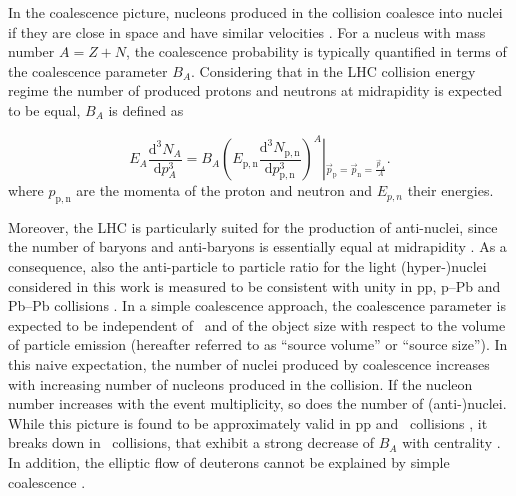 In the coalescence picture, nucleons produced in the collision coalesce into nuclei if they are close in space and have similar velocities \cite{Butler:1963,Kapusta:1980}. 
For a nucleus with mass number $A = Z + N$, the coalescence probability is typically quantified in terms of the coalescence parameter $B_{A}$.
Considering that in the LHC collision energy regime the number of produced protons and neutrons at midrapidity is expected to be equal,  $B_{A}$ is defined as

\begin{equation}
E_{A}\frac{\mathrm{d}^{3}N_{A}}{\mathrm{d}p_{A}^{3}}=B_{A}{\left(E_{\mathrm{p,n}}\frac{\mathrm{d}^{3}N_{\mathrm{p,n}}}{\mathrm{d}p_{\mathrm{p,n}}^{3}}\right)^{A}}\left\vert_{\vec{p}_{\mathrm{p}}=\vec{p}_{\mathrm{n}}=\frac{\vec{p}_{A}}{A}} \right..
\label{eq:BA}
\end{equation}
%
where $p_{\mathrm{p,n}}$ are the momenta of the proton and neutron and $E_{p,n}$ their energies.

Moreover, the LHC is particularly suited for the production of anti-nuclei, since the number of baryons and anti-baryons is essentially equal at midrapidity \cite{Abbas:2013rua}. As a consequence, also the anti-particle to particle ratio for the light (hyper-)nuclei considered in this work is measured to be consistent with unity in pp, p--Pb and Pb--Pb collisions \cite{ALICE:nucleipp2017, anielski-HQ14, Acharya:2017dmc, Adam:2015yta}.
In a simple coalescence approach, the coalescence parameter is expected to be independent of \pt~and of the object size with respect to the volume of particle emission (hereafter referred to as ``source volume'' or ``source size'').
In this naive expectation, the number of nuclei produced by coalescence increases with increasing number of nucleons produced in the collision. If the nucleon number increases with the event multiplicity, so does the number of (anti-)nuclei. 
While this picture is found to be approximately valid in pp and \pPb~collisions \cite{ALICE:nucleipp2017, anielski-HQ14}, it breaks down in \PbPb~collisions, that exhibit a strong decrease of $B_{A}$ with centrality \cite{ALICE:deuteronppPbPb2015}. 
In addition, the elliptic flow of deuterons cannot be explained by simple coalescence \cite{Acharya:2017dmc}. 

